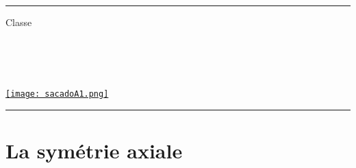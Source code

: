 \documentclass[a4paper,dvipsnames]{article}
\begin{document}

\fancyhead[C]{}
\hrule\medskip %
\begin{minipage}{0.295\textwidth} 
\raggedright
Classe \myClasse \hfill\\
\myDiscipline \hfill\\
\myParcours \hfill\\
\end{minipage}
\begin{minipage}{0.4\textwidth} 
\centering 
\scshape\huge
\textcolor{sacado_purple}{\myTitle} \\ 
\normalsize 
\end{minipage}
\begin{minipage}{0.295\textwidth} 
\raggedleft
\href{https://sacado.xyz/}{\texttt{[image: sacadoA1.png]}}
\end{minipage}
\medskip \hrule
\bigskip


%

\section{La symétrie axiale}
\end{document}
